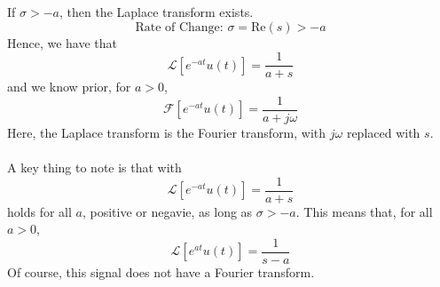 \documentclass[10pt]{article}
\newcommand{\fourier}{\mathcal{F}}
\newcommand{\laplace}{\mathcal{L}}
\begin{document}
If $\sigma > -a$, then the Laplace transform exists.
\[\boxed{\text{Rate of Change:  } \sigma = \text{Re}(s) > -a}\]
Hence, we have that
\[\laplace[e^{-at} u(t)] = \frac{1}{a + s}\]
and we know prior, for $a > 0$,
\[\fourier[e^{-at} u(t)] = \frac{1}{a + j\omega}\]
Here, the Laplace transform is the Fourier transform, with $j\omega$ replaced with $s$.\\\\
A key thing to note is that with 
\[\laplace[e^{-at} u(t)] = \frac{1}{a + s}\]
holds for all $a$, positive or negavie, as long as $\sigma > -a$.  This means that, for all $a > 0$, 
\[\laplace[e^{at} u(t)] = \frac{1}{s - a}\]
Of course, this signal does not have a Fourier transform.
\end{document}
